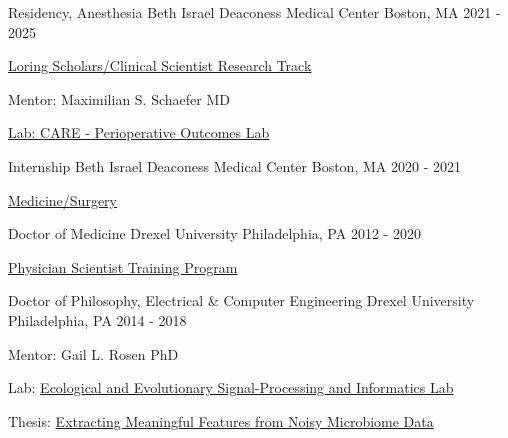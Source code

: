 

\begin{cventries}

  \cventry
    {Residency, Anesthesia}
    {Beth Israel Deaconess Medical Center}
    {Boston, MA}
    {2021 - 2025}
    {
    \begin{cvitems}
    \item \href{https://www.bidmc.org/medical-education/medical-education-by-department/anesthesia-critical-care-and-pain-medicine/anesthesia-residency-program/research-and-other-opportunities/clinician-scientist-track}{Loring Scholars/Clinical Scientist Research Track}
    \item Mentor: Maximilian S. Schaefer MD
    \item \href{https://www.bidmc.org/research/research-by-department/anesthesia-critical-care-and-pain-medicine/research-centers/care}{Lab: CARE - Perioperative Outcomes Lab}
    \end{cvitems}
    }
    
    \cventry
    {Internship}
    {Beth Israel Deaconess Medical Center}
    {Boston, MA}
    {2020 - 2021}
    {
    \begin{cvitems}
    \item \href{https://www.bidmc.org/medical-education/medical-education-by-department/anesthesia-critical-care-and-pain-medicine/anesthesia-residency-program/research-and-other-opportunities/clinician-scientist-track}{Medicine/Surgery}
    \end{cvitems}
    }
 
   \cventry
    {Doctor of Medicine} %
    {Drexel University} %
    {Philadelphia, PA} %
    {2012 - 2020} %
    {
    \begin{cvitems} %
    \item \href{https://drexel.edu/medicine/academics/dual-degree-programs/md-phd/students-alumni/}{Physician Scientist Training Program}
    \end{cvitems}
    }
    
  \cventry
    {Doctor of Philosophy, Electrical \& Computer Engineering} %
    {Drexel University} %
    {Philadelphia, PA} %
    {2014 - 2018} %
    {
      \begin{cvitems} %
         \item Mentor: Gail L. Rosen PhD
         \item Lab: \href{http://drexeleesi.com/}{Ecological and Evolutionary Signal-Processing and Informatics Lab}
	 \item Thesis: \href{https://idea.library.drexel.edu/islandora/object/idea\%3A8189}{Extracting Meaningful Features from Noisy Microbiome Data}
      \end{cvitems}
    }
    

\end{cventries}
